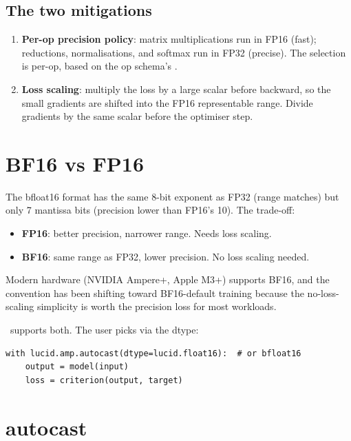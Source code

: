 \subsection{The two mitigations}
\label{ssec:amp:mitigations}

\begin{enumerate}
  \item \textbf{Per-op precision policy}: matrix multiplications
    run in FP16 (fast); reductions, normalisations, and softmax
    run in FP32 (precise). The selection is per-op, based on the
    op schema's .
  \item \textbf{Loss scaling}: multiply the loss by a large
    scalar before backward, so the small gradients are shifted
    into the FP16 representable range. Divide gradients by the
    same scalar before the optimiser step.
\end{enumerate}

\section{BF16 vs FP16}
\label{sec:amp:bf16_vs_fp16}

The bfloat16 format \cite{kalamkar_bfloat16_2019} has the same
8-bit exponent as FP32 (range matches) but only 7 mantissa bits
(precision lower than FP16's 10). The trade-off:

\begin{itemize}
  \item \textbf{FP16}: better precision, narrower range. Needs
    loss scaling.
  \item \textbf{BF16}: same range as FP32, lower precision. No
    loss scaling needed.
\end{itemize}

Modern hardware (NVIDIA Ampere+, Apple M3+) supports BF16, and
the convention has been shifting toward BF16-default training
because the no-loss-scaling simplicity is worth the precision
loss for most workloads.

\Lucid\ supports both. The user picks via the 
dtype:

\begin{lstlisting}[style=lucid,language=LucidPython]
with lucid.amp.autocast(dtype=lucid.float16):  # or bfloat16
    output = model(input)
    loss = criterion(output, target)
\end{lstlisting}

\section{autocast}
\label{sec:amp:autocast}

